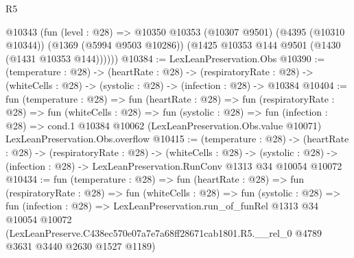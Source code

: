 \begin{lexlean}{R5}
\begin{coremodule}
      @10343
        (fun (level : @28) =>
        @10350
          @10353
          (@10307 @9501)
          (@4395 (@10310 @10344))
          (@1369 (@5994 @9503 @10286))
          (@1425 @10353 @144 @9501 (@1430 (@1431 @10353 @144))))))
@10384 := LexLeanPreservation.Obs
@10390 := (temperature : @28) ->
  (heartRate : @28) ->
  (respiratoryRate : @28) -> (whiteCells : @28) -> (systolic : @28) -> (infection : @28) -> @10384
@10404 := fun (temperature : @28) =>
  fun (heartRate : @28) =>
  fun (respiratoryRate : @28) =>
  fun (whiteCells : @28) =>
  fun (systolic : @28) =>
  fun (infection : @28) =>
  cond.{1} @10384 @10062 (LexLeanPreservation.Obs.value @10071) LexLeanPreservation.Obs.overflow
@10415 := (temperature : @28) ->
  (heartRate : @28) ->
  (respiratoryRate : @28) ->
  (whiteCells : @28) ->
  (systolic : @28) -> (infection : @28) -> LexLeanPreservation.RunConv @1313 @34 @10054 @10072
@10434 := fun (temperature : @28) =>
  fun (heartRate : @28) =>
  fun (respiratoryRate : @28) =>
  fun (whiteCells : @28) =>
  fun (systolic : @28) =>
  fun (infection : @28) =>
  LexLeanPreservation.run_of_funRel
    @1313
    @34
    @10054
    @10072
    (LexLeanPreserve.C438ec570e07a7e7a68ff28671cab1801.R5.__rel_0
      @4789
      @3631
      @3440
      @2630
      @1527
      @1189)
\end{coremodule}
\end{lexlean}
